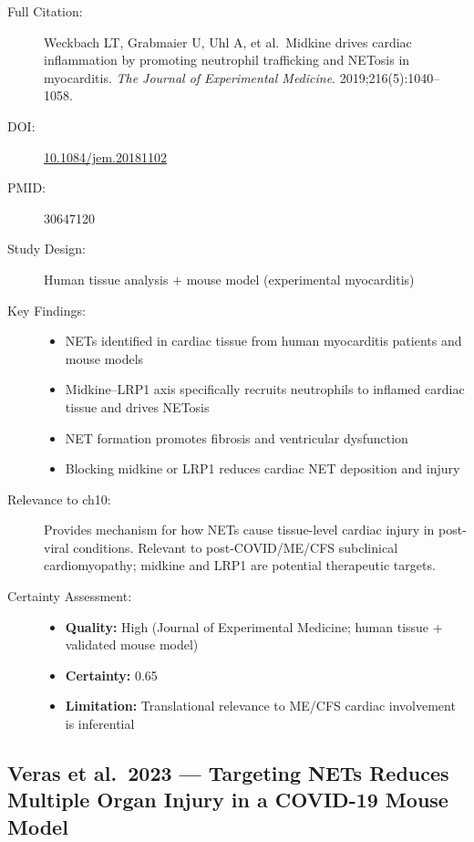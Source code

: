 \begin{description}
    \item[Full Citation:] Weckbach LT, Grabmaier U, Uhl A, et al.\ Midkine drives cardiac inflammation by promoting neutrophil trafficking and NETosis in myocarditis. \textit{The Journal of Experimental Medicine}. 2019;216(5):1040--1058. \cite{Weckbach2019}
    \item[DOI:] \href{https://doi.org/10.1084/jem.20181102}{10.1084/jem.20181102}
    \item[PMID:] 30647120
    \item[Study Design:] Human tissue analysis $+$ mouse model (experimental myocarditis)
    \item[Key Findings:]
    \begin{itemize}
        \item NETs identified in cardiac tissue from human myocarditis patients and mouse models
        \item Midkine--LRP1 axis specifically recruits neutrophils to inflamed cardiac tissue and drives NETosis
        \item NET formation promotes fibrosis and ventricular dysfunction
        \item Blocking midkine or LRP1 reduces cardiac NET deposition and injury
    \end{itemize}
    \item[Relevance to ch10:] Provides mechanism for how NETs cause tissue-level cardiac injury in post-viral conditions. Relevant to post-COVID/ME/CFS subclinical cardiomyopathy; midkine and LRP1 are potential therapeutic targets.
    \item[Certainty Assessment:]
    \begin{itemize}
        \item \textbf{Quality:} High (Journal of Experimental Medicine; human tissue + validated mouse model)
        \item \textbf{Certainty:} 0.65
        \item \textbf{Limitation:} Translational relevance to ME/CFS cardiac involvement is inferential
    \end{itemize}
\end{description}

\subsection{Veras et al.\ 2023 --- Targeting NETs Reduces Multiple Organ Injury in a COVID-19 Mouse Model}

